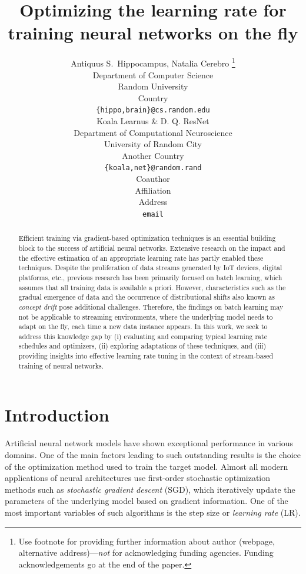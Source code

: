 \documentclass{article} %
\title{Optimizing the learning rate for training neural networks on the fly}
\author{Antiquus S.~Hippocampus, Natalia Cerebro  \thanks{ Use footnote for providing further information
about author (webpage, alternative address)---\emph{not} for acknowledging
funding agencies.  Funding acknowledgements go at the end of the paper.} \\
Department of Computer Science\\
Random University\\
Country \\
\texttt{\{hippo,brain\}@cs.random.edu} \\
\And %
Koala Learnus \& D. Q. ResNet  \\
Department of Computational Neuroscience \\
University of Random City \\
Another Country \\
\texttt{\{koala,net\}@random.rand} \\
\AND %
Coauthor \\
Affiliation \\
Address \\
\texttt{email}
}
\begin{document}
\maketitle

\begin{abstract}
   Efficient training via gradient-based optimization techniques is an essential building block to the success of artificial neural networks. Extensive research on the impact and the effective estimation of an appropriate learning rate has partly enabled these techniques. Despite the proliferation of data streams generated by IoT devices, digital platforms, etc., previous research has been primarily focused on batch learning, which assumes that all training data is available a priori. However, characteristics such as the gradual emergence of data and the occurrence of distributional shifts also known as \textit{concept drift} pose additional challenges. Therefore, the findings on batch learning may not be applicable to streaming environments, where the underlying model needs to adapt on the fly, each time a new data instance appears. In this work, we seek to address this knowledge gap by (i) evaluating and comparing typical learning rate schedules and optimizers, (ii) exploring adaptations of these techniques, and (iii) providing insights into effective learning rate tuning in the context of stream-based training of neural networks.
\end{abstract}

\section{Introduction}
Artificial neural network models have shown exceptional performance in various domains.
One of the main factors leading to such outstanding results is the choice of the optimization method used to train the target model.
Almost all modern applications of neural architectures use first-order stochastic optimization methods such as \textit{stochastic gradient descent} (SGD), which iteratively update the parameters of the underlying model based on gradient information.
One of the most important variables of such algorithms is the step size or \textit{learning rate} (LR).
\end{document}
